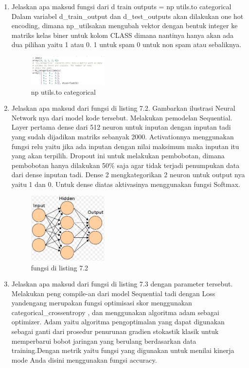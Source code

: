\begin{enumerate}
        \item Jelaskan apa maksud fungsi dari d train outputs = np utils.to categorical
Dalam variabel d\_train\_output dan d\_test\_outputs akan dilakukan one hot encoding, dimana np\_utilsakan mengubah vektor dengan bentuk integer ke matriks kelas biner untuk kolom CLASS dimana nantinya hanya akan ada dua pilihan yaitu 1 atau 0. 1 untuk spam 0 untuk non spam atau sebaliknya.

	\begin{figure}[H]
		\includegraphics[width=4cm]{figures/1174008/7/teori5.PNG}
            	\centering
           	 \caption{np utils.to categorical}
       	 \end{figure}

        \item Jelaskan apa maksud dari fungsi di listing 7.2. Gambarkan ilustrasi Neural Network nya dari model kode tersebut.
Melakukan pemodelan Sequential. Layer pertama dense dari 512 neuron untuk inputan dengan inputan tadi yang sudah dijadikan matriks sebanyak 2000. Activationnya menggunakan fungsi relu yaitu jika ada inputan dengan nilai maksimum maka inputan itu yang akan terpilih. Dropout ini untuk melakukan pembobotan, dimana pembobotan hanya dilakukan 50\% saja agar tidak terjadi penumpukan data dari dense inputan tadi. Dense 2 mengkategorikan 2 neuron untuk output nya yaitu 1 dan 0. Untuk dense diatas aktivasinya menggunakan fungsi Softmax.

	\begin{figure}[H]
		\includegraphics[width=4cm]{figures/1174008/7/teori6.PNG}
            	\centering
           	 \caption{fungsi di listing 7.2}
       	 \end{figure}

        \item Jelaskan apa maksud dari fungsi di listing 7.3 dengan parameter tersebut.
Melakukan peng compile-an dari model Sequential tadi dengan Loss yandengang merupakan fungsi optimisasi skor  menggunakan categorical\_crossentropy , dan menggunakan algoritma adam sebagai optimizer. Adam yaitu algoritma pengoptimalan yang dapat digunakan sebagai ganti dari prosedur penurunan gradien stokastik klasik untuk memperbarui bobot jaringan yang berulang berdasarkan data training.Dengan metrik yaitu fungsi yang digunakan untuk menilai kinerja mode Anda disini menggunakan fungsi accuracy.


\end{enumerate}
